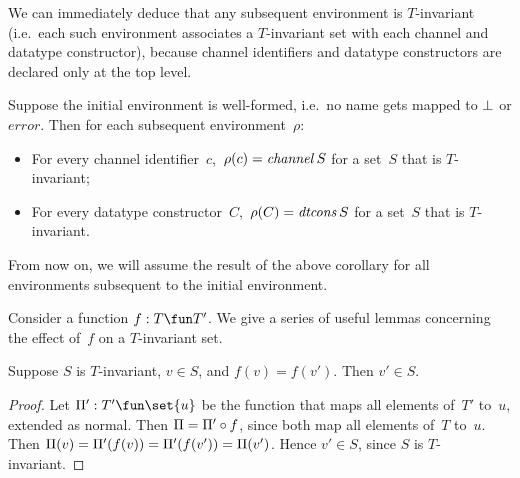 
We can immediately deduce that any subsequent environment is $T$-invariant
(i.e.~each such environment associates a $T$-invariant set with each channel
and datatype constructor), because channel identifiers and datatype
constructors are declared only at the top level.
%
\begin{corollary}
\label{cor:invariant}
Suppose the initial environment is well-formed, i.e.~no name gets mapped to
$\perp$ or $error$.  Then for each subsequent environment~$\rho$:
\begin{itemize}
\item For every channel identifier~$c$,\, $\rho(c) = \mathop{\it channel} S$ for a set~$S$
  that is $T$-invariant;

\item For every datatype constructor~$C$,\, $\rho(C) = \mathop{\it dtcons} S$ for a
  set~$S$ that is $T$-invariant.
\end{itemize}
\end{corollary}
%
From now on, we will assume the result of the above corollary for all
environments subsequent to the initial environment. 


Consider a function $f: T \fun T'$.  We give a series of useful lemmas
concerning the effect of~$f$ on a $T$-invariant set.  




\begin{lemma}
\label{lem:T-invariant-vs-f}
Suppose $S$ is $T$-invariant, $v \in S$, and $f(v) = f(v')$.  Then $v' \in S$.
\end{lemma}
%
\begin{proof}
Let $\unitf' : T' \fun \set{u}$ be the function that maps all elements
of~$T'$ to~$u$, extended as normal.  Then $\Pi = \Pi' \circ f$, since
both map all elements of~$T$ to~$u$.  Then $\Pi(v) = \Pi'(f(v)) =
\Pi'(f(v')) = \Pi(v')$.  Hence $v' \in S$, since $S$ is $T$-invariant.
\end{proof}

